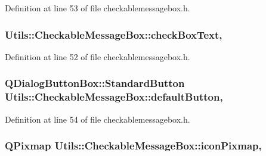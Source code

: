 Definition at line 53 of file checkablemessagebox.\-h.

\hypertarget{class_utils_1_1_checkable_message_box_a47682e1634b9d1806e19abc75a3d13dc}{
\subsubsection[{check\-Box\-Text}]{ Utils\-::\-Checkable\-Message\-Box\-::check\-Box\-Text\hspace{0.3cm}{\ttfamily [read]}, {\ttfamily [write]}}}\label{class_utils_1_1_checkable_message_box_a47682e1634b9d1806e19abc75a3d13dc}


Definition at line 52 of file checkablemessagebox.\-h.

\hypertarget{class_utils_1_1_checkable_message_box_ab3ac6c8016a1f22d503293af7434db0f}{
\subsubsection[{default\-Button}]{\setlength{\rightskip}{0pt plus 5cm}Q\-Dialog\-Button\-Box\-::\-Standard\-Button Utils\-::\-Checkable\-Message\-Box\-::default\-Button\hspace{0.3cm}{\ttfamily [read]}, {\ttfamily [write]}}}\label{class_utils_1_1_checkable_message_box_ab3ac6c8016a1f22d503293af7434db0f}


Definition at line 54 of file checkablemessagebox.\-h.

\hypertarget{class_utils_1_1_checkable_message_box_aee6ca7e2633372c9938d00a307ff2dc7}{
\subsubsection[{icon\-Pixmap}]{\setlength{\rightskip}{0pt plus 5cm}Q\-Pixmap Utils\-::\-Checkable\-Message\-Box\-::icon\-Pixmap\hspace{0.3cm}{\ttfamily [read]}, {\ttfamily [write]}}}\label{class_utils_1_1_checkable_message_box_aee6ca7e2633372c9938d00a307ff2dc7}


